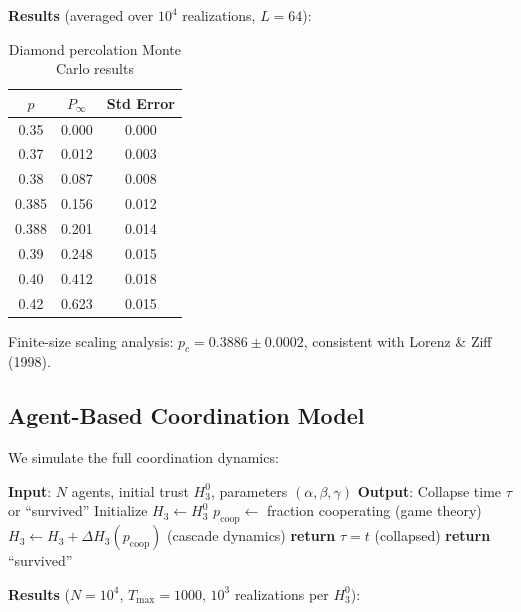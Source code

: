 \documentclass[11pt]{article}
\begin{document}
\textbf{Results} (averaged over $10^4$ realizations, $L = 64$):

\begin{table}[h]
\centering
\caption{Diamond percolation Monte Carlo results}
\begin{tabular}{@{}ccc@{}}
\toprule
$p$ & $P_\infty$ & Std Error \\
\midrule
0.35 & 0.000 & 0.000 \\
0.37 & 0.012 & 0.003 \\
0.38 & 0.087 & 0.008 \\
0.385 & 0.156 & 0.012 \\
0.388 & 0.201 & 0.014 \\
0.39 & 0.248 & 0.015 \\
0.40 & 0.412 & 0.018 \\
0.42 & 0.623 & 0.015 \\
\bottomrule
\end{tabular}
\end{table}

Finite-size scaling analysis: $p_c = 0.3886 \pm 0.0002$, consistent with Lorenz \& Ziff (1998).

\subsection{Agent-Based Coordination Model}

We simulate the full coordination dynamics:

\begin{algorithm}
\caption{Coordination Collapse Simulation}
\begin{algorithmic}
\STATE \textbf{Input}: $N$ agents, initial trust $H_3^0$, parameters $(\alpha, \beta, \gamma)$
\STATE \textbf{Output}: Collapse time $\tau$ or ``survived''
\STATE Initialize $H_3 \leftarrow H_3^0$
    \STATE $p_{\text{coop}} \leftarrow $ fraction cooperating (game theory)
    \STATE $H_3 \leftarrow H_3 + \Delta H_3(p_{\text{coop}})$ (cascade dynamics)
        \STATE \textbf{return} $\tau = t$ (collapsed)
    \ENDIF
\ENDFOR
\STATE \textbf{return} ``survived''
\end{algorithmic}
\end{algorithm}

\textbf{Results} ($N = 10^4$, $T_{\max} = 1000$, $10^3$ realizations per $H_3^0$):
\end{document}
